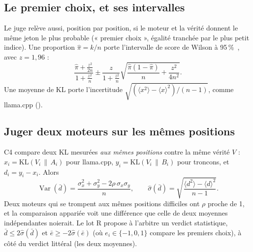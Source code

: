 \subsection{Le premier choix, et ses intervalles}

Le juge relève aussi, position par position, si le moteur et la vérité donnent le même jeton le plus probable (« premier choix », égalité tranchée par le plus petit indice). Une proportion $\hat\pi = k/n$ porte l'intervalle de score de Wilson à 95\,\%~\cite{wilson1927}, avec $z = 1{,}96$ :
\begin{equation}\label{eq:t2r-wilson}
\frac{\hat\pi + \frac{z^2}{2n}}{1 + \frac{z^2}{n}} \pm \frac{z}{1 + \frac{z^2}{n}}\sqrt{\frac{\hat\pi(1-\hat\pi)}{n} + \frac{z^2}{4n^2}} .
\end{equation}
Une moyenne de KL porte l'incertitude $\sqrt{(\langle x^2\rangle - \langle x\rangle^2)/(n-1)}$, comme llama.cpp ().

\subsection{Juger deux moteurs sur les mêmes positions}\label{sec:t2r-apparie}

C4 compare deux KL mesurées \emph{aux mêmes positions} contre la même vérité $V$ : $x_i = \mathrm{KL}(V_i\,\|\,A_i)$ pour llama.cpp, $y_i = \mathrm{KL}(V_i\,\|\,B_i)$ pour troncons, et $d_i = y_i - x_i$. Alors
\begin{equation}\label{eq:t2r-apparie}
\operatorname{Var}(\bar d) = \frac{\sigma_x^2 + \sigma_y^2 - 2\rho\,\sigma_x\sigma_y}{n},\qquad
\hat\sigma(\bar d) = \sqrt{\frac{\langle d^2\rangle - \langle d\rangle^2}{n-1}} .
\end{equation}
Deux moteurs qui se trompent aux mêmes positions difficiles ont $\rho$ proche de 1, et la comparaison appariée voit une différence que celle de deux moyennes indépendantes noierait. Le lot R propose à l'arbitre un verdict statistique, $\bar d \le 2\hat\sigma(\bar d)$ et $\bar e \ge -2\hat\sigma(\bar e)$ (où $e_i \in \{-1, 0, 1\}$ compare les premiers choix), à côté du verdict littéral (les deux moyennes).

